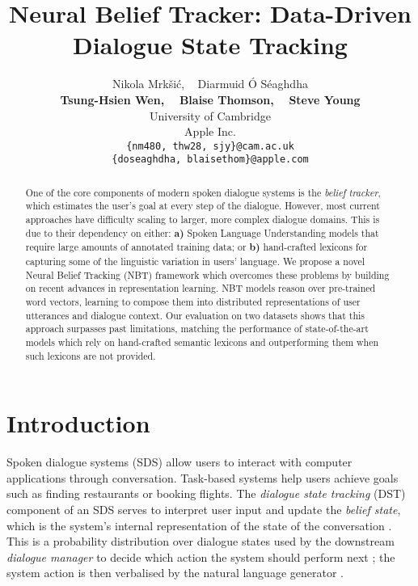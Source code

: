 \documentclass[11pt,a4paper]{article}
\title{Neural Belief Tracker: Data-Driven Dialogue State Tracking}
\author{Nikola Mrk\v{s}i\'c, ~ Diarmuid {\'O S\'eaghdha} \\ 
\textbf{Tsung-Hsien Wen, ~ {Blaise Thomson, ~ Steve Young}}  \\
   University of Cambridge  \\
   Apple Inc.  \\
  { \tt \{nm480, thw28, sjy\}@cam.ac.uk} \\ { \tt\{doseaghdha, blaisethom\}@apple.com}}
\date{}
\begin{document}
\maketitle


\begin{abstract}

One of the core components of modern spoken dialogue systems is the \textit{belief tracker}, which estimates the user's goal at every step of the dialogue. However, most current approaches have difficulty scaling to larger, more complex dialogue domains. This is due to their dependency on either: \textbf{a)} Spoken Language Understanding models that require large amounts of annotated training data; or \textbf{b)} hand-crafted lexicons for capturing some of the linguistic variation in users' language. We propose a novel Neural Belief Tracking (NBT) framework which overcomes these problems by building on recent advances in representation learning. NBT models reason over pre-trained word vectors, learning to compose them into distributed representations of user utterances and dialogue context. Our evaluation on two datasets shows that this approach surpasses past limitations, matching the performance of state-of-the-art models which rely on hand-crafted semantic lexicons and outperforming them when such lexicons are not provided.



\end{abstract}

\section{Introduction}

Spoken dialogue systems (SDS) allow users to interact with computer applications through conversation. Task-based systems help users achieve goals such as finding restaurants or booking flights. The \emph{dialogue state tracking} (DST) component of an SDS serves to interpret user input and update the \emph{belief state}, which is the system's internal representation of the state of the conversation \cite{young:10c}. This is a probability distribution over dialogue states used by the downstream \emph{dialogue manager} to decide which action the system should perform next \cite{su:2016:nnpolicy,Su:16}; the system action is then verbalised by the {natural language generator} \cite{wen:15a,wen:15b,Dusek:15}.   
\end{document}
